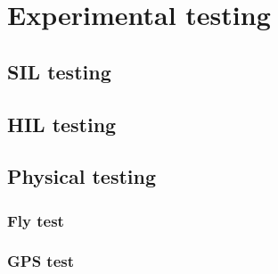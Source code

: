 
\chapter{Experimental testing}
\section{SIL testing}
\section{HIL testing}
\section{Physical testing}
\subsection{Fly test}
\subsection{GPS test}
\cleardoublepage